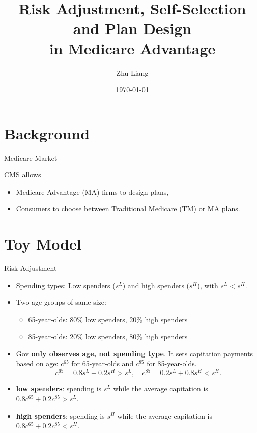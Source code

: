 \documentclass[professionalfonts, aspectratio=169]{beamer}
\title{Risk Adjustment, Self-Selection and Plan Design \\ in Medicare Advantage}
\institute{Stony Brook University}
\author{Zhu Liang}
\date{\today}
\begin{document}

\begin{frame} %
    \titlepage
\end{frame}

\section{Background}
\begin{frame}{Medicare Market}
\begin{figure}
  \centering
  \resizebox{0.6\textwidth}{!}{}
\end{figure}

CMS allows
\begin{itemize}\small
  \item Medicare Advantage (MA) firms to design plans,
  \item Consumers to choose between Traditional Medicare (TM) or MA plans.
\end{itemize}
\end{frame}

\section{Toy Model}

\begin{frame}{Risk Adjustment}
  \begin{itemize}
      \item Spending types: Low spenders ($s^L$) and high spenders ($s^H$), with $s^L < s^H$.
      \item Two age groups of same size:
      \begin{itemize}
          \item 65-year-olds: 80\% low spenders, 20\% high spenders
          \item 85-year-olds: 20\% low spenders, 80\% high spenders
      \end{itemize}
      \item Gov \textbf{only observes age, not spending type}. It sets capitation payments based on age: $c^{65}$ for 65-year-olds and $c^{85}$ for 85-year-olds.
      $$ c^{65} = 0.8s^L + 0.2s^H > s^L, \quad c^{85} = 0.2s^L + 0.8s^H < s^H. $$
      \item \textbf{low spenders}: spending is $ s^L $ while the average capitation is $ 0.8 c^{65} + 0.2 c^{85} > s^L $.
      \item \textbf{high spenders}: spending is $ s^H $ while the average capitation is $ 0.8 c^{65} + 0.2 c^{85} < s^H $.
  \end{itemize}
\end{frame}
\end{document}
